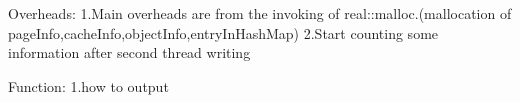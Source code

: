 Overheads:
    1.Main overheads are from the invoking of real::malloc.(mallocation of pageInfo,cacheInfo,objectInfo,entryInHashMap)
    2.Start counting some information after second thread writing

Function:
    1.how to output